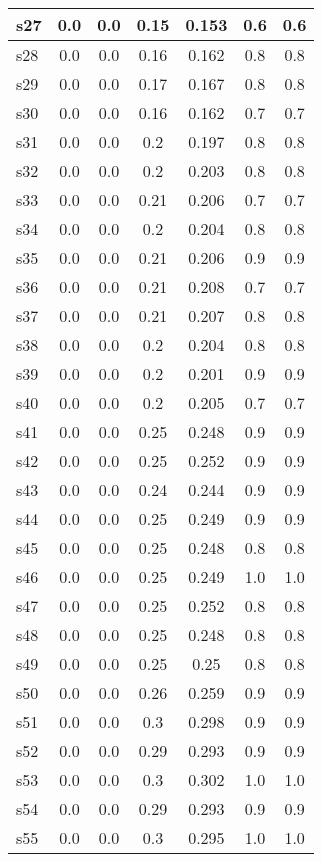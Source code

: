 \documentclass{article}
\begin{document}
\begin{tabular}{|l|c|c|c|c|c|c|}
\hline
s27 &0.0 & 0.0 & 0.15 & 0.153 & 0.6 & 0.6\\
\hline
s28 &0.0 & 0.0 & 0.16 & 0.162 & 0.8 & 0.8\\
\hline
s29 &0.0 & 0.0 & 0.17 & 0.167 & 0.8 & 0.8\\
\hline
s30 &0.0 & 0.0 & 0.16 & 0.162 & 0.7 & 0.7\\
\hline
s31 &0.0 & 0.0 & 0.2 & 0.197 & 0.8 & 0.8\\
\hline
s32 &0.0 & 0.0 & 0.2 & 0.203 & 0.8 & 0.8\\
\hline
s33 &0.0 & 0.0 & 0.21 & 0.206 & 0.7 & 0.7\\
\hline
s34 &0.0 & 0.0 & 0.2 & 0.204 & 0.8 & 0.8\\
\hline
s35 &0.0 & 0.0 & 0.21 & 0.206 & 0.9 & 0.9\\
\hline
s36 &0.0 & 0.0 & 0.21 & 0.208 & 0.7 & 0.7\\
\hline
s37 &0.0 & 0.0 & 0.21 & 0.207 & 0.8 & 0.8\\
\hline
s38 &0.0 & 0.0 & 0.2 & 0.204 & 0.8 & 0.8\\
\hline
s39 &0.0 & 0.0 & 0.2 & 0.201 & 0.9 & 0.9\\
\hline
s40 &0.0 & 0.0 & 0.2 & 0.205 & 0.7 & 0.7\\
\hline
s41 &0.0 & 0.0 & 0.25 & 0.248 & 0.9 & 0.9\\
\hline
s42 &0.0 & 0.0 & 0.25 & 0.252 & 0.9 & 0.9\\
\hline
s43 &0.0 & 0.0 & 0.24 & 0.244 & 0.9 & 0.9\\
\hline
s44 &0.0 & 0.0 & 0.25 & 0.249 & 0.9 & 0.9\\
\hline
s45 &0.0 & 0.0 & 0.25 & 0.248 & 0.8 & 0.8\\
\hline
s46 &0.0 & 0.0 & 0.25 & 0.249 & 1.0 & 1.0\\
\hline
s47 &0.0 & 0.0 & 0.25 & 0.252 & 0.8 & 0.8\\
\hline
s48 &0.0 & 0.0 & 0.25 & 0.248 & 0.8 & 0.8\\
\hline
s49 &0.0 & 0.0 & 0.25 & 0.25 & 0.8 & 0.8\\
\hline
s50 &0.0 & 0.0 & 0.26 & 0.259 & 0.9 & 0.9\\
\hline
s51 &0.0 & 0.0 & 0.3 & 0.298 & 0.9 & 0.9\\
\hline
s52 &0.0 & 0.0 & 0.29 & 0.293 & 0.9 & 0.9\\
\hline
s53 &0.0 & 0.0 & 0.3 & 0.302 & 1.0 & 1.0\\
\hline
s54 &0.0 & 0.0 & 0.29 & 0.293 & 0.9 & 0.9\\
\hline
s55 &0.0 & 0.0 & 0.3 & 0.295 & 1.0 & 1.0\\

\end{tabular}
\end{document}
